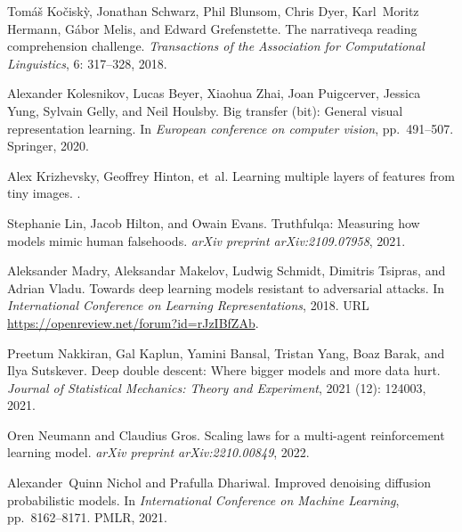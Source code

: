 \documentclass{article} %
\begin{document}
\begin{thebibliography}{61}
Tom{\'a}{\v{s}} Ko{\v{c}}isk{\`y}, Jonathan Schwarz, Phil Blunsom, Chris Dyer,
  Karl~Moritz Hermann, G{\'a}bor Melis, and Edward Grefenstette.
\newblock The narrativeqa reading comprehension challenge.
\newblock \emph{Transactions of the Association for Computational Linguistics},
  6: 317--328, 2018.

Alexander Kolesnikov, Lucas Beyer, Xiaohua Zhai, Joan Puigcerver, Jessica Yung,
  Sylvain Gelly, and Neil Houlsby.
\newblock Big transfer (bit): General visual representation learning.
\newblock In \emph{European conference on computer vision}, pp.\  491--507.
  Springer, 2020.

Alex Krizhevsky, Geoffrey Hinton, et~al.
\newblock Learning multiple layers of features from tiny images.
.

Stephanie Lin, Jacob Hilton, and Owain Evans.
\newblock Truthfulqa: Measuring how models mimic human falsehoods.
\newblock \emph{arXiv preprint arXiv:2109.07958}, 2021.

Aleksander Madry, Aleksandar Makelov, Ludwig Schmidt, Dimitris Tsipras, and
  Adrian Vladu.
\newblock Towards deep learning models resistant to adversarial attacks.
\newblock In \emph{International Conference on Learning Representations}, 2018.
\newblock URL \url{https://openreview.net/forum?id=rJzIBfZAb}.

Preetum Nakkiran, Gal Kaplun, Yamini Bansal, Tristan Yang, Boaz Barak, and Ilya
  Sutskever.
\newblock Deep double descent: Where bigger models and more data hurt.
\newblock \emph{Journal of Statistical Mechanics: Theory and Experiment},
  2021 (12): 124003, 2021.

Oren Neumann and Claudius Gros.
\newblock Scaling laws for a multi-agent reinforcement learning model.
\newblock \emph{arXiv preprint arXiv:2210.00849}, 2022.

Alexander~Quinn Nichol and Prafulla Dhariwal.
\newblock Improved denoising diffusion probabilistic models.
\newblock In \emph{International Conference on Machine Learning}, pp.\
  8162--8171. PMLR, 2021.


\end{thebibliography}
\end{document}
